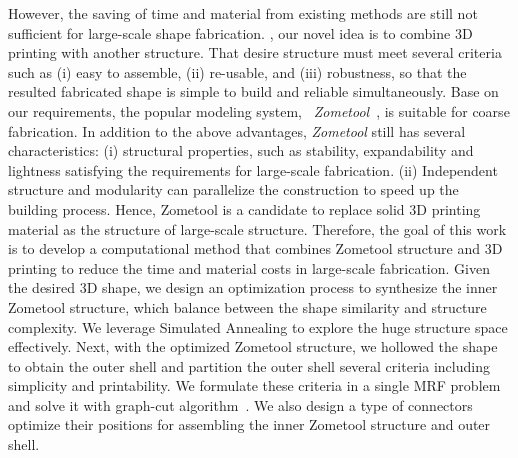 However, the saving of time and material from existing methods are still not sufficient for large-scale shape fabrication.
, our novel idea is to combine 3D printing with another structure. 
That desire structure must meet several criteria such as (i) easy to assemble, (ii) re-usable, and (iii) robustness, so that the resulted fabricated shape is simple to build and reliable simultaneously. 
Base on our requirements, the popular modeling system, \ie~\emph{Zometool}~\cite{davis2007mathematics}, is suitable for coarse fabrication.
In addition to the above advantages, \emph{Zometool} still has several  characteristics: 
(i) structural properties, such as stability, expandability and lightness satisfying the requirements for large-scale fabrication. 
(ii) Independent structure and modularity can parallelize the construction to speed up the building process.
Hence, Zometool is a  candidate to replace solid 3D printing material as the  structure of large-scale structure.
Therefore, the goal of this work is to develop a computational method that combines Zometool structure and 3D printing to reduce the time and material costs in large-scale fabrication.
Given the desired 3D shape, we design an optimization process to synthesize the inner Zometool structure, which balance between the shape similarity and structure complexity.
We leverage Simulated Annealing to explore the huge structure space effectively.
Next, with the optimized Zometool structure, we hollowed the shape to obtain the outer shell and partition the outer shell  several criteria including simplicity and printability.
We formulate these criteria in a single MRF problem and solve it with graph-cut algorithm~\cite{boykov:2004:experimental}.
We also design a  type of connectors  optimize their positions for assembling the inner Zometool structure and outer shell.

